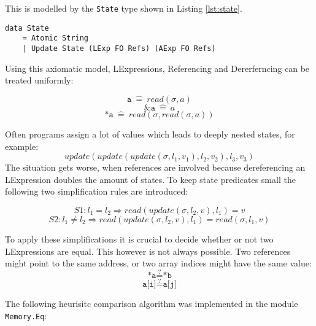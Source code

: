 \documentclass[12pt]{article}
\begin{document}
This is modelled by the \texttt{State} type shown in Listing \ref{lst:state}.

\begin{lstlisting}[style=c0, caption=State, label=lst:state]
data State
    = Atomic String
    | Update State (LExp FO Refs) (AExp FO Refs)
\end{lstlisting}

Using this axiomatic model, LExpressions, Referencing and Dererferncing can be treated uniformly:

\[ \texttt{a}\ \hat{=}\ read(\sigma, a) \]
\[ \texttt{\&a}\ \hat{=}\ a \]
\[ \texttt{*a}\ \hat{=}\ read(\sigma, read(\sigma, a))\]

Often programs assign a lot of values which leads to deeply nested states, for example:
\[ update(update(update(\sigma, l_1, v_1), l_2, v_2), l_3, v_3) \]
The situation gets worse, when references are involved because dereferencing an LExpression doubles the amount of states. 
To keep state predicates small the following two simplification rules are introduced:

\[ S1: l_1 = l_2 \Rightarrow read(update(\sigma, l_2 , v), l_1) = v \]
\[ S2: l_1 \neq l_2 \Rightarrow read(update(\sigma, l_2 , v), l_1) = read(\sigma, l_1 , v) \]

To apply these simplifications it is crucial to decide whether or not two LExpressions are equal.
This however is not always possible.
Two references might point to the same address, or two array indices might have the same value:
\[ \texttt{*a} \stackrel{?}{=} \texttt{*b} \]
\[ \texttt{a[i]} \stackrel{?}{=} \texttt{a[j]} \]

The following heurisitc comparison algorithm was implemented in the module \texttt{Memory.Eq}:
\end{document}
